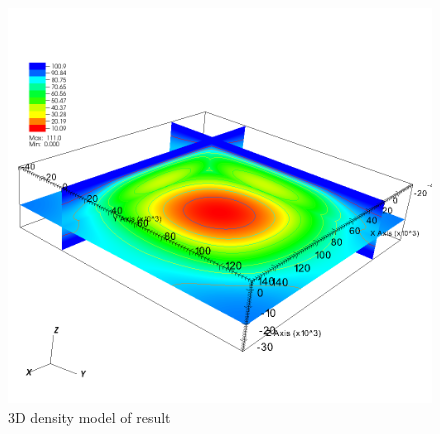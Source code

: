 \begin{figure}
\centering
\includegraphics[width=\textwidth]{gravity3D.png}
\caption{3D density model of result}

\end{figure}
